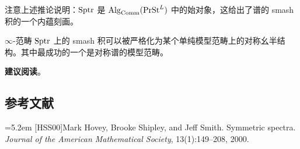 \begin{remark}\label{L25-4.9}
注意上述推论说明：$\operatorname{Sptr}$ 是 $\operatorname{Alg}_{\mathrm{Comm}}(\operatorname{PrSt}^{L})$ 中的始对象，这给出了谱的 smash 积的一个内蕴刻画。
\end{remark}


\nitem\label{L25-A.1} $\infty$-范畴 $\operatorname{Sptr}$ 上的 smash 积可以被严格化为某个单纯模型范畴上的对称幺半结构。其中最成功的一个是对称谱的模型范畴。

\nitem\label{L25-A.2} \textbf{建议阅读}\quad [HSS00]。

\subsection*{参考文献}
\par\noindent\hangindent=5.2em [HSS00]\hspace{0.6em}Mark Hovey, Brooke Shipley, and Jeff Smith. Symmetric spectra. \emph{Journal of the American Mathematical Society}, 13(1):149--208, 2000.

